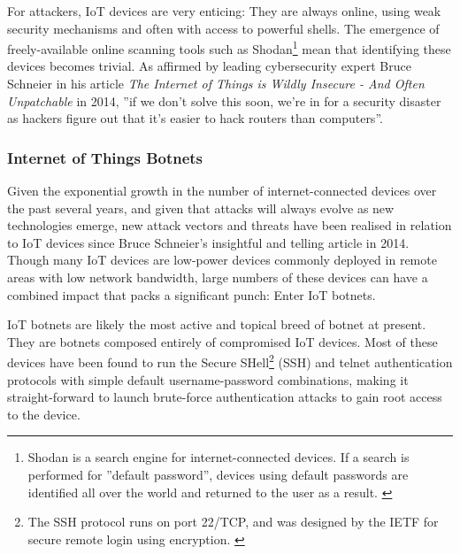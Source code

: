For attackers, IoT devices are very enticing: They are always online, using weak security mechanisms and often with access to powerful shells. The emergence of freely-available online scanning tools such as Shodan\footnote{Shodan is a search engine for internet-connected devices. If a search is performed for ''default password'', devices using default passwords are identified all over the world and returned to the user as a result. \cite{ShodanDefaultPasswordSearch}} mean that identifying these devices becomes trivial. As affirmed by leading cybersecurity expert Bruce Schneier in his article \textit{The Internet of Things is Wildly Insecure - And Often Unpatchable} in 2014, ''if we don't solve this soon, we're in for a security disaster as hackers figure out that it's easier to hack routers than computers''. \cite{TheresNoGoodWayToPatchTheIoT}

\subsubsection{Internet of Things Botnets} \label{IoTBotnetsSoA}

Given the exponential growth in the number of internet-connected devices over the past several years, and given that attacks will always evolve as new technologies emerge,  new attack vectors and threats have been realised in relation to IoT devices since Bruce Schneier's insightful and telling article in 2014. \cite{TheresNoGoodWayToPatchTheIoT} Though many IoT devices are low-power devices commonly deployed in remote areas with low network bandwidth, large numbers of these devices can have a combined impact that packs a significant punch: Enter IoT botnets.

IoT botnets are likely the most active and topical breed of botnet at present. They are botnets composed entirely of compromised IoT devices. Most of these devices have been found to run the Secure SHell\footnote{The SSH protocol runs on port 22/TCP, and was designed by the IETF for secure remote login using encryption. \cite{rfc4252}} (SSH) and telnet authentication protocols with simple default username-password combinations, making it straight-forward to launch brute-force authentication attacks to gain root access to the device.

